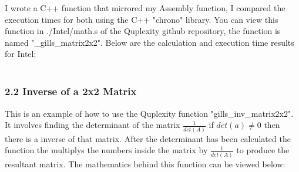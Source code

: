 \documentclass{article}
\begin{document}
\begin{center}
\end{center}

\noindent I wrote a C++ function that mirrored my Assembly function, I compared the execution times for both using the C++ "chrono" library.
You can view this function in ./Intel/math.s of the Quplexity github repository, the function is named "\_gills\_matrix2x2".
Below are the calculation and execution time results for Intel: \\

\noindent {} \\

\subsubsection*{2.2 Inverse of a 2x2 Matrix}
This is an example of how to use the Quplexity function "gills\_inv\_matrix2x2". It involves finding the determinant of the matrix $\frac{1}{det(A)}$ if $det(a) \neq 0$ then there is a inverse of that matrix.
After the determinant has been calculated the function the multiplys the numbers inside the matrix by $\frac{1}{det(A)}$ to produce the \\
resultant matrix. The mathematics behind this function can be viewed below: \\
\end{document}

